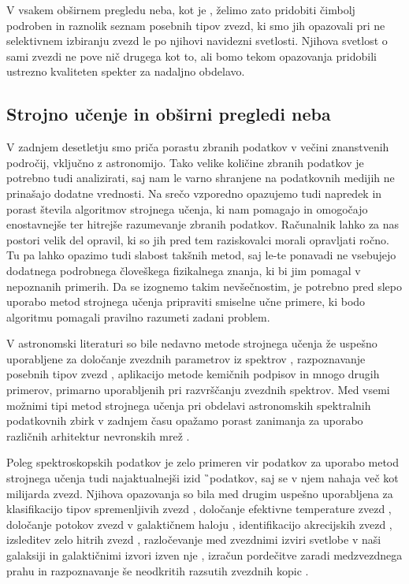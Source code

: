 V vsakem obširnem pregledu neba, kot je \Gh, želimo zato pridobiti čimbolj podroben in raznolik seznam posebnih tipov zvezd, ki smo jih opazovali pri ne selektivnem izbiranju zvezd le po njihovi navidezni svetlosti. Njihova svetlost o sami zvezdi ne pove nič drugega kot to, ali bomo tekom opazovanja pridobili ustrezno kvaliteten spekter za nadaljno obdelavo.

\subsection{Strojno učenje in obširni pregledi neba}
V zadnjem desetletju smo priča porastu zbranih podatkov v večini znanstvenih področij, vključno z astronomijo. Tako velike količine zbranih podatkov je potrebno tudi analizirati, saj nam le varno shranjene na podatkovnih medijih ne prinašajo dodatne vrednosti. Na srečo vzporedno opazujemo tudi napredek in porast števila algoritmov strojnega učenja, ki nam pomagajo in omogočajo enostavnejše ter hitrejše razumevanje zbranih podatkov. Računalnik lahko za nas postori velik del opravil, ki so jih pred tem raziskovalci morali opravljati ročno. Tu pa lahko opazimo tudi slabost takšnih metod, saj le-te ponavadi ne vsebujejo dodatnega podrobnega človeškega fizikalnega znanja, ki bi jim pomagal v nepoznanih primerih. Da se izognemo takim nevšečnostim, je potrebno pred slepo uporabo metod strojnega učenja pripraviti smiselne učne primere, ki bodo algoritmu pomagali pravilno razumeti zadani problem.

V astronomski literaturi so bile nedavno metode strojnega učenja že uspešno uporabljene za določanje zvezdnih parametrov iz spektrov \cite{2015ApJ...808...16N, buder2018, 2019ApJ...879...69T}, razpoznavanje posebnih tipov zvezd \cite{2017ApJS..228...24T}, aplikacijo metode kemičnih podpisov \cite{2015A&A...577A..47B, 2016ApJ...833..262H,2018MNRAS.473.4612K, 2018A&A...619A.125A, 2017MNRAS.467.1140J, 2018A&A...618A..65B} in mnogo drugih primerov, primarno uporabljenih pri razvrščanju zvezdnih spektrov. Med vsemi možnimi tipi metod strojnega učenja pri obdelavi astronomskih spektralnih podatkovnih zbirk v zadnjem času opažamo porast zanimanja za uporabo različnih arhitektur nevronskih mrež \cite{2015MNRAS.452..158Y, 2019MNRAS.483.3255L, 2020ApJ...891...23W, 2020arXiv200208390O}.

Poleg spektroskopskih podatkov je zelo primeren vir podatkov za uporabo metod strojnega učenja tudi najaktualnejši izid \G\ podatkov, saj se v njem nahaja več kot milijarda zvezd. Njihova opazovanja so bila med drugim uspešno uporabljena za klasifikacijo tipov spremenljivih zvezd \cite{2020MNRAS.493.2981B}, določanje efektivne temperature zvezd \cite{2019AJ....158...93B}, določanje potokov zvezd v galaktičnem haloju \cite{2017A&A...598A..58H, 2020MNRAS.492.1370B}, identifikacijo akrecijskih zvezd \cite{2019arXiv190706652O, 2019arXiv190707681N}, izsleditev zelo hitrih zvezd \cite{2017MNRAS.470.1388M}, razločevanje med zvezdnimi izviri svetlobe v naši galaksiji in galaktičnimi izvori izven nje \cite{2018RAA....18..118B, 2019MNRAS.490.5615B}, izračun pordečitve zaradi medzvezdnega prahu \cite{2020AJ....159...84B} in razpoznavanje še neodkritih razsutih zvezdnih kopic \cite{2020A&A...635A..45C}.

